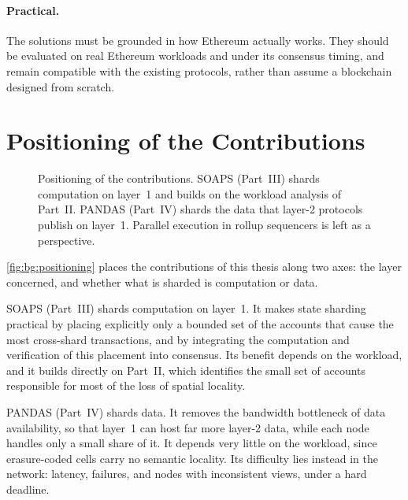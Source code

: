 \paragraph{Practical.}
The solutions must be grounded in how Ethereum actually works.
They should be evaluated on real Ethereum workloads and under its consensus timing, and remain compatible with the existing protocols, rather than assume a blockchain designed from scratch.

\section{Positioning of the Contributions}\label{sec:bg:positioning}


\begin{figure}[t]
	\centering
	\resizebox{\linewidth}{!}{}
	\caption{Positioning of the contributions.
		SOAPS (Part~III) shards computation on layer~1 and builds on the workload analysis of Part~II.
		PANDAS (Part~IV) shards the data that layer-2 protocols publish on layer~1.
		Parallel execution in rollup sequencers is left as a perspective.}
	\label{fig:bg:positioning}
\end{figure}

\autoref{fig:bg:positioning} places the contributions of this thesis along two axes: the layer concerned, and whether what is sharded is computation or data.

SOAPS (Part~III) shards computation on layer~1.
It makes state sharding practical by placing explicitly only a bounded set of the accounts that cause the most cross-shard transactions, and by integrating the computation and verification of this placement into consensus.
Its benefit depends on the workload, and it builds directly on Part~II, which identifies the small set of accounts responsible for most of the loss of spatial locality.

PANDAS (Part~IV) shards data.
It removes the bandwidth bottleneck of data availability, so that layer~1 can host far more layer-2 data, while each node handles only a small share of it.
It depends very little on the workload, since erasure-coded cells carry no semantic locality.
Its difficulty lies instead in the network: latency, failures, and nodes with inconsistent views, under a hard deadline.

